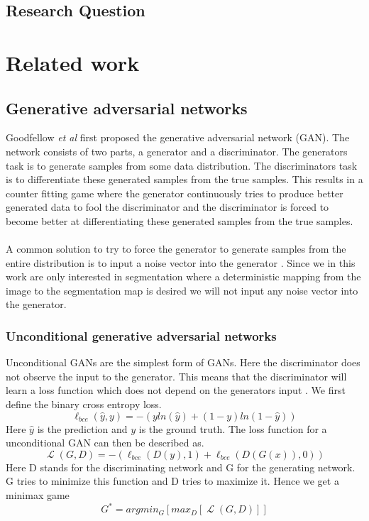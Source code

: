 \documentclass{kththesis}
\DeclareMathOperator{\Lagr}{\mathcal{L}}
\begin{document}
\section{Research Question}

\blindtext

\chapter{Related work}
\section{Generative adversarial networks}
Goodfellow \textit{et al} \parencite{goodfellow_nips_2016} first proposed the generative adversarial network (GAN). The network consists of two parts, a generator and a discriminator. The generators task is to generate samples from some data distribution. The discriminators task is to differentiate these generated samples from the true samples. This results in a counter fitting game where the generator continuously tries to produce better generated data to fool the discriminator and the discriminator is forced to become better at differentiating these generated samples from the true samples.\\
\\
A common solution to try to force the generator to generate samples from the entire distribution is to input a noise vector into the generator \parencite{reed_generative_2016}. Since we in this work are only interested in segmentation where a deterministic mapping from the image to the segmentation map is desired we will not input any  noise vector into the generator.
\subsection{Unconditional generative adversarial networks}
Unconditional GANs are the simplest form of GANs. Here the discriminator does not observe the input to the generator. This means that the discriminator will learn a loss function which does not depend on the generators input \parencite{isola_image--image_2016}. We first define the binary cross entropy loss.
\begin{equation}\label{eq:bce}
\ell_{bce}(\hat{y}, y)=-(yln(\hat{y})+(1-y)ln(1-\hat{y}))
\end{equation}
Here $\hat{y}$ is the prediction and $y$ is the ground truth.
The loss function for a unconditional GAN can then be described as.
 \begin{equation}
\Lagr(G, D) = -(\ell_{bce}(D(y), 1) + \ell_{bce}(D(G(x)), 0))
\end{equation}
Here D stands for the discriminating network and G for the generating network. G tries to minimize this function and D tries to maximize it. Hence we get a minimax game 
\begin{equation}
G^{*}=argmin_{G}[max_{D}[\Lagr(G, D)]]\label{eq:minimax}
\end{equation}
\end{document}

